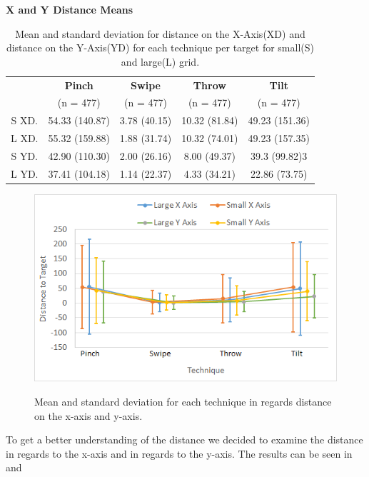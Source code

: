 \begin{table}[H]
	\centering
	\textbf{X and Y Distance Means}\\[4pt]
	\begin{adjustbox}{width=\columnwidth}
	\begin{tabular}{|c|c|c|c|c|}
		\hline
		\rowcolor[HTML]{9B9B9B} 
		& \textbf{Pinch} & \textbf{Swipe} & \textbf{Throw} & \textbf{Tilt} \\
		\rowcolor[HTML]{9B9B9B} 
		& (n = 477) & (n = 477) & (n = 477) & (n = 477) \\ \hline
		S XD. & 54.33 (140.87) & 3.78 (40.15) & 10.32 (81.84) & 49.23 (151.36) \\ \hline
		L XD. & 55.32 (159.88) & 1.88 (31.74) & 10.32 (74.01) & 49.23 (157.35) \\ \hline
		S YD. & 42.90 (110.30) & 2.00 (26.16) & 8.00 (49.37) & 39.3 (99.82)3 \\ \hline
		L YD. & 37.41 (104.18) & 1.14 (22.37) & 4.33 (34.21) & 22.86 (73.75) \\ \hline
	\end{tabular}
	\end{adjustbox}
	\caption{Mean and standard deviation for distance on the X-Axis(XD) and distance on the Y-Axis(YD) for each technique per target for small(S) and large(L) grid.}
	\label{tab:distanceXY}
\end{table}

\begin{figure}[H]
	{\includegraphics[width = 1\columnwidth ]{images/distance_axis.png}} 
	\caption{
		Mean and standard deviation for each technique in regards distance on the x-axis and y-axis.
	}
	\label{fig:distanceXYResults}
\end{figure}

To get a better understanding of the distance we decided to examine the distance in regards to the x-axis and in regards to the y-axis.
The results can be seen in  and 


